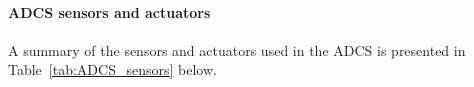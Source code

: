 \documentclass[12pt]{article}
\begin{document}
				\paragraph{ADCS sensors and actuators}
				A summary of the sensors and actuators used in the ADCS is presented in Table~\ref{tab:ADCS_sensors} below. 
\end{document}
